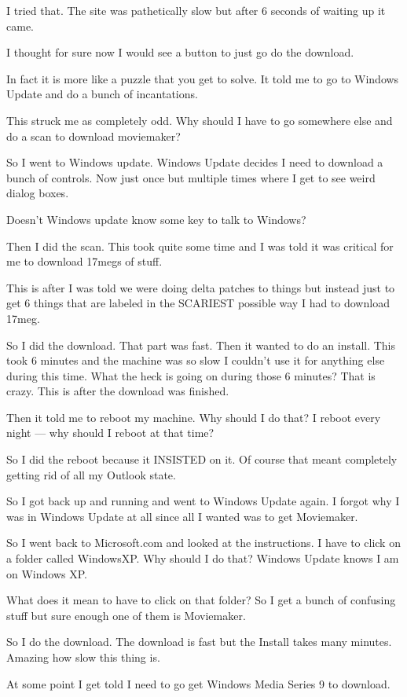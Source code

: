 \documentclass[12pt,letterpaper]{article}
\begin{document}
I tried that.
The site was pathetically slow but after 6 seconds of waiting up it came.

I thought for sure now I would see a button to just go do the download.

In fact it is more like a puzzle that you get to solve.
It told me to go to Windows Update and do a bunch of incantations.

This struck me as completely odd.
Why should I have to go somewhere else and do a scan to download moviemaker?

So I went to Windows update.
Windows Update decides I need to download a bunch of controls.
Now just once but multiple times where I get to see weird dialog boxes.

Doesn't Windows update know some key to talk to Windows?

Then I did the scan.
This took quite some time and I was told it was critical for me to download
17megs of stuff.

This is after I was told we were doing delta patches to things but instead
just to get 6 things that are labeled in the SCARIEST possible way I had to
download 17meg.

So I did the download.
That part was fast.
Then it wanted to do an install.
This took 6 minutes and the machine was so slow I couldn't use it for
anything else during this time.  What the heck is going on during those 6
minutes?
That is crazy.
This is after the download was finished.

Then it told me to reboot my machine.
Why should I do that?
I reboot every night --- why should I reboot at that time?

So I did the reboot because it INSISTED on it.
Of course that meant completely getting rid of all my Outlook state.

So I got back up and running and went to Windows Update again.
I forgot why I was in Windows Update at all since all I wanted was to get
Moviemaker.

So I went back to Microsoft.com and looked at the instructions.
I have to click on a folder called WindowsXP.
Why should I do that?
Windows Update knows I am on Windows XP.

What does it mean to have to click on that folder?
So I get a bunch of confusing stuff but sure enough one of them is
Moviemaker.

So I do the download.
The download is fast but the Install takes many minutes.
Amazing how slow this thing is.

At some point I get told I need to go get Windows Media Series 9 to download.
\end{document}
